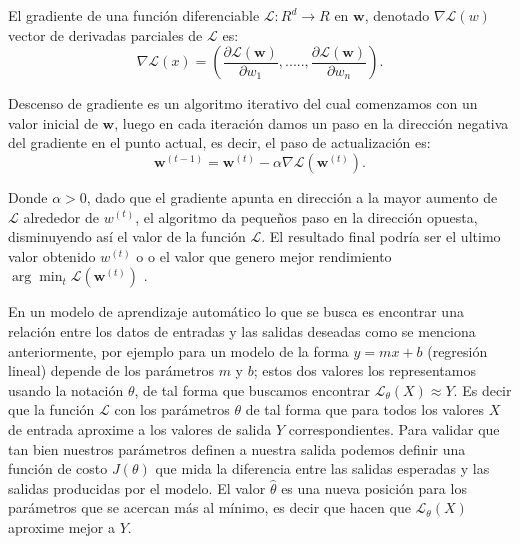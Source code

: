 El gradiente de una función diferenciable $ \mathcal{L}: R^d \longrightarrow R $ en $\textbf{w}$, denotado $ \nabla \mathcal{L}(w) $ vector de derivadas parciales de $\mathcal{L}$ es:
\begin{equation}
\nabla \mathcal{L}(x) = (\frac{\partial \mathcal{L}(\textbf{w})}{\partial w_1},....., \frac{\partial \mathcal{L}(\textbf{w})}{\partial w_n}).
\end{equation}

Descenso de gradiente es un algoritmo iterativo del cual comenzamos con un valor inicial de $\textbf{w}$, luego en cada iteración damos un paso en la dirección negativa del gradiente en el punto actual, es decir, el paso de actualización es:
\begin{equation}
\textbf{w}^{(t-1)} = \textbf{w}^{(t)} - \alpha \nabla \mathcal{L}(\textbf{w}^{(t)}).
\end{equation}

Donde $ \alpha > 0$, dado que el gradiente apunta en  dirección a la mayor aumento de $\mathcal{L}$ alrededor de $w^{(t)}$, el algoritmo da pequeños paso en la dirección opuesta, disminuyendo así el valor de la función $\mathcal{L}$. El resultado final podría ser el ultimo valor obtenido $w^{(t)}$ o o el valor que genero mejor rendimiento $\arg\min_{t}\mathcal{L}(\textbf{w}^{(t)})$ \citep{gradient_des}.


En un modelo de aprendizaje automático lo que se busca es encontrar una relación entre los datos de entradas y las salidas deseadas como se menciona anteriormente, por ejemplo para un modelo de la forma $y= mx+b$ (regresión lineal) depende de los parámetros  $m$ y $b$;  estos dos valores los representamos usando la notación $\theta$, de tal forma que buscamos encontrar $\mathcal{L}_{\theta} (X) \approx Y$. Es decir que la función $\mathcal{L}$ con los parámetros $\theta$ de tal forma que para todos los valores $X$ de entrada aproxime a los valores de salida $Y$ correspondientes. Para validar que tan bien nuestros parámetros definen a nuestra salida podemos definir una función de costo $J(\theta)$ que mida la diferencia entre las salidas esperadas y las salidas producidas por el modelo. El valor $\hat\theta$ es una nueva posición para los parámetros que se acercan más al mínimo, es decir que hacen que $\mathcal{L}_\theta(X)$ aproxime mejor a $Y$.

